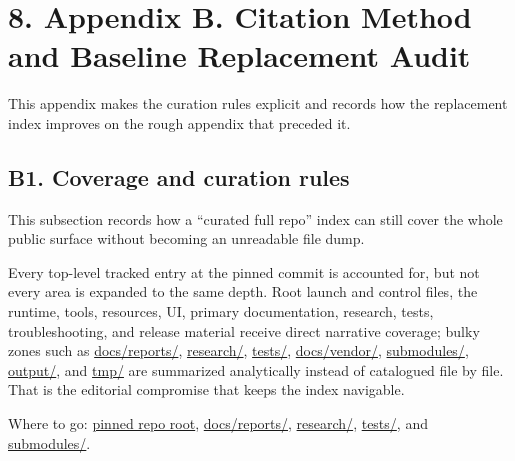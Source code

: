 \section{8. Appendix B. Citation Method and Baseline Replacement
Audit}\label{appendix-b.-citation-method-and-baseline-replacement-audit}

This appendix makes the curation rules explicit and records how the
replacement index improves on the rough appendix that preceded it.

\subsection{B1. Coverage and curation
rules}\label{b1.-coverage-and-curation-rules}

This subsection records how a ``curated full repo'' index can still
cover the whole public surface without becoming an unreadable file dump.

Every top-level tracked entry at the pinned commit is accounted for, but
not every area is expanded to the same depth. Root launch and control
files, the runtime, tools, resources, UI, primary documentation,
research, tests, troubleshooting, and release material receive direct
narrative coverage; bulky zones such as
\href{https://github.com/chris-page-gov/mcp-geo/tree/fe862910da246ca77f374cfbe484985f5df4d316/docs/reports}{docs/reports/},
\href{https://github.com/chris-page-gov/mcp-geo/tree/fe862910da246ca77f374cfbe484985f5df4d316/research}{research/},
\href{https://github.com/chris-page-gov/mcp-geo/tree/fe862910da246ca77f374cfbe484985f5df4d316/tests}{tests/},
\href{https://github.com/chris-page-gov/mcp-geo/tree/fe862910da246ca77f374cfbe484985f5df4d316/docs/vendor}{docs/vendor/},
\href{https://github.com/chris-page-gov/mcp-geo/tree/fe862910da246ca77f374cfbe484985f5df4d316/submodules}{submodules/},
\href{https://github.com/chris-page-gov/mcp-geo/tree/fe862910da246ca77f374cfbe484985f5df4d316/output}{output/},
and
\href{https://github.com/chris-page-gov/mcp-geo/tree/fe862910da246ca77f374cfbe484985f5df4d316/tmp}{tmp/}
are summarized analytically instead of catalogued file by file. That is
the editorial compromise that keeps the index navigable.

Where to go:
\href{https://github.com/chris-page-gov/mcp-geo/tree/fe862910da246ca77f374cfbe484985f5df4d316}{pinned
repo root},
\href{https://github.com/chris-page-gov/mcp-geo/tree/fe862910da246ca77f374cfbe484985f5df4d316/docs/reports}{docs/reports/},
\href{https://github.com/chris-page-gov/mcp-geo/tree/fe862910da246ca77f374cfbe484985f5df4d316/research}{research/},
\href{https://github.com/chris-page-gov/mcp-geo/tree/fe862910da246ca77f374cfbe484985f5df4d316/tests}{tests/},
and
\href{https://github.com/chris-page-gov/mcp-geo/tree/fe862910da246ca77f374cfbe484985f5df4d316/submodules}{submodules/}.

